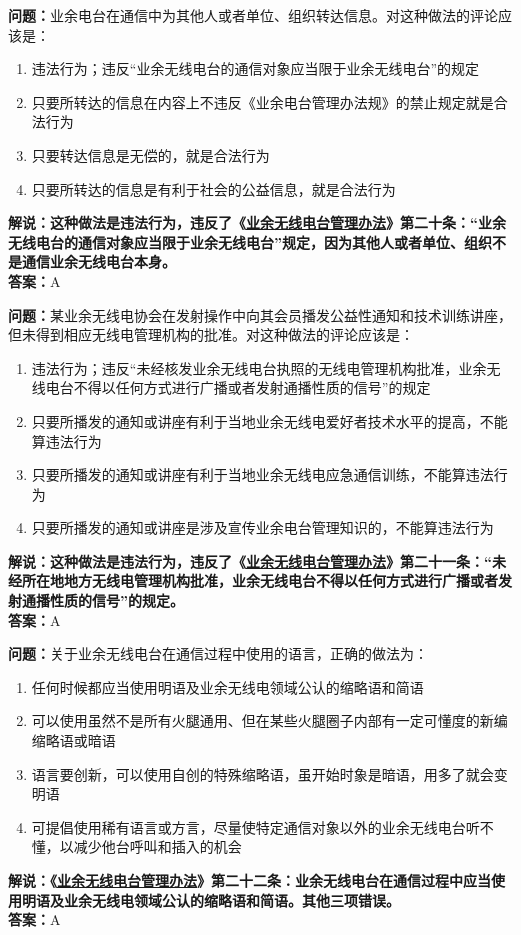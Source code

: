 \textbf{问题：}业余电台在通信中为其他人或者单位、组织转达信息。对这种做法的评论应该是：
\begin{enumerate}[label=\Alph*), leftmargin=1cm]
	\item 违法行为；违反“业余无线电台的通信对象应当限于业余无线电台”的规定
	\item 只要所转达的信息在内容上不违反《业余电台管理办法规》的禁止规定就是合法行为
	\item 只要转达信息是无偿的，就是合法行为
	\item 只要所转达的信息是有利于社会的公益信息，就是合法行为
\end{enumerate}
\textbf{解说：这种做法是违法行为，违反了《\href{https://www.miit.gov.cn/jgsj/zfs/bmgz/art/2020/art_147b69815b3641caad9047735f94c860.html}{业余无线电台管理办法}》第二十条：“业余无线电台的通信对象应当限于业余无线电台”规定，因为其他人或者单位、组织不是通信业余无线电台本身。}\\\textbf{答案：}A

\textbf{问题：}某业余无线电协会在发射操作中向其会员播发公益性通知和技术训练讲座，但未得到相应无线电管理机构的批准。对这种做法的评论应该是：
\begin{enumerate}[label=\Alph*), leftmargin=1cm]
	\item 违法行为；违反“未经核发业余无线电台执照的无线电管理机构批准，业余无线电台不得以任何方式进行广播或者发射通播性质的信号”的规定
	\item 只要所播发的通知或讲座有利于当地业余无线电爱好者技术水平的提高，不能算违法行为
	\item 只要所播发的通知或讲座有利于当地业余无线电应急通信训练，不能算违法行为
	\item 只要所播发的通知或讲座是涉及宣传业余电台管理知识的，不能算违法行为
\end{enumerate}
\textbf{解说：这种做法是违法行为，违反了《\href{https://www.miit.gov.cn/jgsj/zfs/bmgz/art/2020/art_147b69815b3641caad9047735f94c860.html}{业余无线电台管理办法}》第二十一条：“未经所在地地方无线电管理机构批准，业余无线电台不得以任何方式进行广播或者发射通播性质的信号”的规定。}\\\textbf{答案：}A

\textbf{问题：}关于业余无线电台在通信过程中使用的语言，正确的做法为：
\begin{enumerate}[label=\Alph*), leftmargin=1cm]
	\item 任何时候都应当使用明语及业余无线电领域公认的缩略语和简语
	\item 可以使用虽然不是所有火腿通用、但在某些火腿圈子内部有一定可懂度的新编缩略语或暗语
	\item 语言要创新，可以使用自创的特殊缩略语，虽开始时象是暗语，用多了就会变明语
	\item 可提倡使用稀有语言或方言，尽量使特定通信对象以外的业余无线电台听不懂，以减少他台呼叫和插入的机会
\end{enumerate}
\textbf{解说：《\href{https://www.miit.gov.cn/jgsj/zfs/bmgz/art/2020/art_147b69815b3641caad9047735f94c860.html}{业余无线电台管理办法}》第二十二条：业余无线电台在通信过程中应当使用明语及业余无线电领域公认的缩略语和简语。其他三项错误。}\\\textbf{答案：}A

